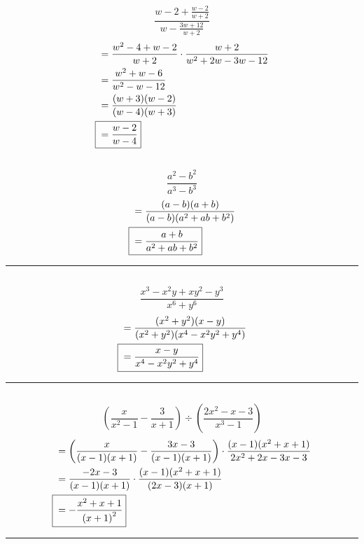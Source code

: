 	\subsection{}
		\[\frac{w - 2 + \frac{w - 2}{w + 2}}{w - \frac{3w + 12}{w + 2}}\]
		\begin{align*}
			&= \frac{w^2 - 4 + w - 2}{w + 2} \cdot \frac{w + 2}{w^2 + 2w - 3w - 12} \\
			&= \frac{w^2 + w - 6}{w^2 - w - 12} \\
			&= \frac{(w + 3)(w - 2)}{(w - 4)(w + 3)} \\
			\Aboxed{{} &= \frac{w - 2}{w - 4}}
		\end{align*}

	\subsection{}
		\[\frac{a^2 - b^2}{a^3 - b^3}\]
		\begin{align*}
			&= \frac{(a - b)(a + b)}{(a - b)(a^2 + ab + b^2)} \\
			\Aboxed{{} &= \frac{a + b}{a^2 + ab + b^2}}
		\end{align*}
		\hrule{}

	\subsection{}
		\[\frac{x^3 - x^2y + xy^2 - y^3}{x^6 + y^6}\]
		\begin{align*}
			&= \frac{(x^2 + y^2)(x - y)}{(x^2 + y^2)(x^4 - x^2y^2 + y^4)} \\
			\Aboxed{{} &= \frac{x - y}{x^4 - x^2y^2 + y^4}}
		\end{align*}
		\hrule{}

	\subsection{}
		\[\left(\frac{x}{x^2 - 1} - \frac{3}{x + 1}\right) \div \left(\frac{2x^2 - x - 3}{x^3 - 1}\right)\]
		\begin{align*}
			&= \left(\frac{x}{(x - 1)(x + 1)} - \frac{3x - 3}{(x - 1)(x + 1)}\right) \cdot \frac{(x - 1)(x^2 + x + 1)}{2x^2 + 2x - 3x - 3} \\
			&= \frac{-2x - 3}{(x - 1)(x + 1)} \cdot \frac{(x - 1)(x^2 + x + 1)}{(2x - 3)(x + 1)} \\
			\Aboxed{{} &= -\frac{x^2 + x + 1}{{(x + 1)}^2}}
		\end{align*}
		\hrule{}

